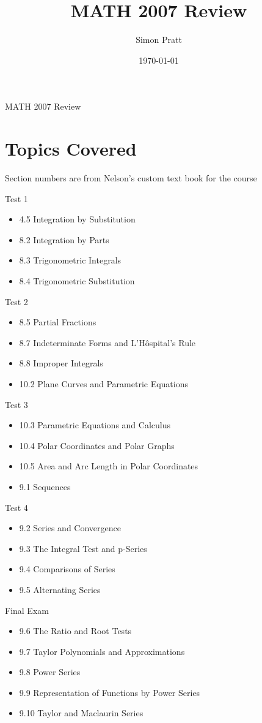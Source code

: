 \documentclass{article}
\title{MATH 2007 Review}
\author{Simon Pratt}
\date{\today}
\begin{document}
{\Huge MATH 2007 Review}

\section{Topics Covered}
{\tiny *Section numbers are from Nelson's custom text book for the course}

Test 1
\begin{itemize}
\item 4.5 Integration by Substitution
\item 8.2 Integration by Parts
\item 8.3 Trigonometric Integrals
\item 8.4 Trigonometric Substitution
\end{itemize}

Test 2
\begin{itemize}
\item 8.5 Partial Fractions
\item 8.7 Indeterminate Forms and L'H\^{o}spital's Rule
\item 8.8 Improper Integrals
\item 10.2 Plane Curves and Parametric Equations
\end{itemize}

Test 3
\begin{itemize}
\item 10.3 Parametric Equations and Calculus
\item 10.4 Polar Coordinates and Polar Graphs
\item 10.5 Area and Arc Length in Polar Coordinates
\item 9.1 Sequences
\end{itemize}

Test 4
\begin{itemize}
\item 9.2 Series and Convergence
\item 9.3 The Integral Test and p-Series
\item 9.4 Comparisons of Series
\item 9.5 Alternating Series
\end{itemize}

Final Exam
\begin{itemize}
\item 9.6 The Ratio and Root Tests
\item 9.7 Taylor Polynomials and Approximations
\item 9.8 Power Series
\item 9.9 Representation of Functions by Power Series
\item 9.10 Taylor and Maclaurin Series
\end{itemize}
\end{document}
